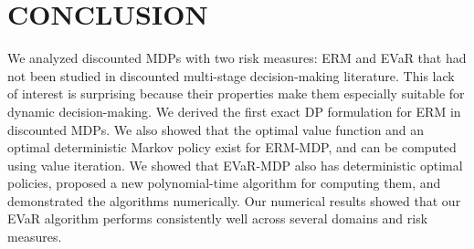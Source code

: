 \documentclass[twoside]{article}
\theoremstyle{plain}
\theoremstyle{definition}
\theoremstyle{remark}
\begin{document}



\section{CONCLUSION}
\label{ent:sec:conclusion} 

We analyzed discounted MDPs with two risk measures: ERM and EVaR that had not been studied in discounted multi-stage decision-making literature. This lack of interest is surprising because their properties make them especially suitable for dynamic decision-making. We derived the first exact DP formulation for ERM in discounted MDPs. We also showed that the optimal value function and an optimal deterministic Markov policy exist for ERM-MDP, and can be computed using value iteration. We showed that EVaR-MDP also has deterministic optimal policies, proposed a new polynomial-time algorithm for computing them, and demonstrated the algorithms numerically. Our numerical results showed that our EVaR algorithm performs consistently well across several domains and risk measures.



\end{document}
